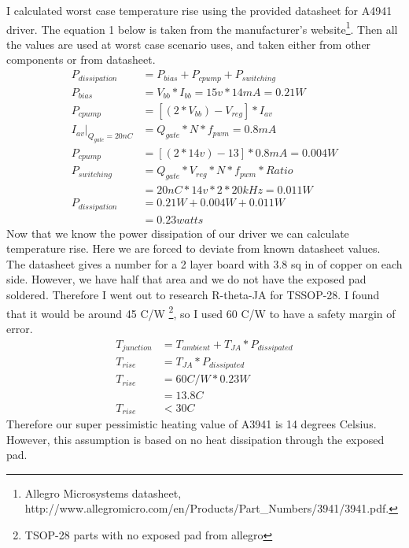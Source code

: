 \documentclass[12pt]{article}
\begin{document}
I calculated worst case temperature rise using the provided datasheet for A4941 driver. The equation 1 below is taken from the manufacturer's website\footnote{Allegro Microsystems datasheet, http://www.allegromicro.com/en/Products/Part\_Numbers/3941/3941.pdf.}. Then all the values are used at worst case scenario uses, and taken either from other components or from datasheet. 
\begin{align}
P_{dissipation} &= P_{bias} + P_{cpump} + P_{switching} 
\\ P_{bias} &= V_{bb} * I_{bb} = 15 v * 14 mA = 0.21 W
\\ P_{cpump} &=[(2 * V_{bb})-V_{reg}] * I_{av}  
\\ I_{av}|_{Q_{gate}=20 nC} &= Q_{gate} * N  * f_{pwm} = 0.8 mA
\\ P_{cpump} &= [(2 * 14 v) - 13] * 0.8 mA = 0.004 W
\\
P_{switching} &=Q_{gate} * V_{reg} * N * f_{pwm} * Ratio \\
    &= 20 nC * 14 v * 2 * 20 kHz = 0.011 W
 \\ P_{dissipation} &= 0.21 W + 0.004 W + 0.011 W 
 \\ &=0.23 watts
\end{align} 
Now that we know the power dissipation of our driver we can calculate temperature rise. Here we are forced to deviate from known datasheet values. The datasheet gives a number for a 2 layer board with 3.8 sq in of copper on each side. However, we have half that area and we do not have the exposed pad soldered. Therefore I went out to research R-theta-JA for TSSOP-28. I found that it would be around 45 C/W \footnote{TSOP-28 parts with no exposed pad from allegro}, so I used 60 C/W to have a safety margin of error.
\begin{align}
T_{junction} &= T_{ambient} + T_{JA} * P_{dissipated}
\\T_{rise} &= T_{JA} * P_{dissipated}
\\T_{rise} &= 60 C/W * 0.23 W
\\&=13.8 C
\\T_{rise}&<30 C
\end{align}
Therefore our super pessimistic heating value of A3941 is 14 degrees Celsius. However, this assumption is based on no heat dissipation through the exposed pad. 
\end{document}
